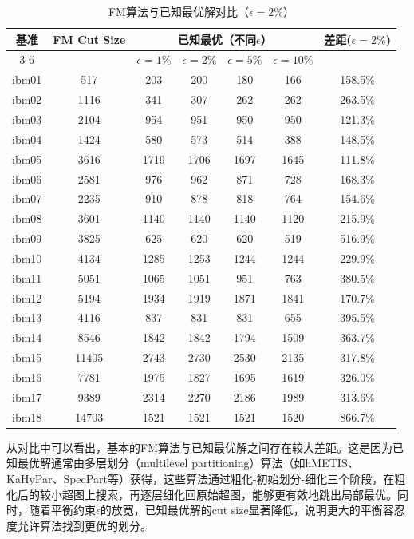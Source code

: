 \documentclass{SYSUReport}
\begin{document}
\begin{table}[H]
\centering
\caption{FM算法与已知最优解对比（$\epsilon = 2\%$）}
\begin{tabular}{|c|c|c|c|c|c|c|}
\hline
\multirow{2}{*}{基准} & \multirow{2}{*}{FM Cut Size} & \multicolumn{4}{c|}{已知最优（不同$\epsilon$）} & \multirow{2}{*}{差距($\epsilon=2\%$)} \\
\cline{3-6}
 & & $\epsilon=1\%$ & $\epsilon=2\%$ & $\epsilon=5\%$ & $\epsilon=10\%$ & \\
\hline
ibm01 & 517 & 203 & 200 & 180 & 166 & 158.5\% \\
\hline
ibm02 & 1116 & 341 & 307 & 262 & 262 & 263.5\% \\
\hline
ibm03 & 2104 & 954 & 951 & 950 & 950 & 121.3\% \\
\hline
ibm04 & 1424 & 580 & 573 & 514 & 388 & 148.5\% \\
\hline
ibm05 & 3616 & 1719 & 1706 & 1697 & 1645 & 111.8\% \\
\hline
ibm06 & 2581 & 976 & 962 & 871 & 728 & 168.3\% \\
\hline
ibm07 & 2235 & 910 & 878 & 818 & 764 & 154.6\% \\
\hline
ibm08 & 3601 & 1140 & 1140 & 1140 & 1120 & 215.9\% \\
\hline
ibm09 & 3825 & 625 & 620 & 620 & 519 & 516.9\% \\
\hline
ibm10 & 4134 & 1285 & 1253 & 1244 & 1244 & 229.9\% \\
\hline
ibm11 & 5051 & 1065 & 1051 & 951 & 763 & 380.5\% \\
\hline
ibm12 & 5194 & 1934 & 1919 & 1871 & 1841 & 170.7\% \\
\hline
ibm13 & 4116 & 837 & 831 & 831 & 655 & 395.5\% \\
\hline
ibm14 & 8546 & 1842 & 1842 & 1794 & 1509 & 363.7\% \\
\hline
ibm15 & 11405 & 2743 & 2730 & 2530 & 2135 & 317.8\% \\
\hline
ibm16 & 7781 & 1975 & 1827 & 1695 & 1619 & 326.0\% \\
\hline
ibm17 & 9389 & 2314 & 2270 & 2186 & 1989 & 313.6\% \\
\hline
ibm18 & 14703 & 1521 & 1521 & 1521 & 1520 & 866.7\% \\
\hline
\end{tabular}
\end{table}

从对比中可以看出，基本的FM算法与已知最优解之间存在较大差距。这是因为已知最优解通常由多层划分（multilevel partitioning）算法（如hMETIS、KaHyPar、SpecPart等）获得，这些算法通过粗化-初始划分-细化三个阶段，在粗化后的较小超图上搜索，再逐层细化回原始超图，能够更有效地跳出局部最优。同时，随着平衡约束$\epsilon$的放宽，已知最优解的cut size显著降低，说明更大的平衡容忍度允许算法找到更优的划分。
\end{document}
